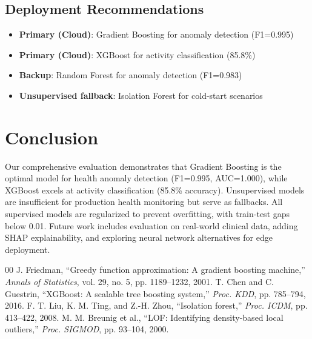 \documentclass[conference]{IEEEtran}
\begin{document}
\subsection{Deployment Recommendations}
\begin{itemize}
    \item \textbf{Primary (Cloud)}: Gradient Boosting for anomaly detection (F1=0.995)
    \item \textbf{Primary (Cloud)}: XGBoost for activity classification (85.8\%)
    \item \textbf{Backup}: Random Forest for anomaly detection (F1=0.983)
    \item \textbf{Unsupervised fallback}: Isolation Forest for cold-start scenarios
\end{itemize}

\section{Conclusion}
Our comprehensive evaluation demonstrates that Gradient Boosting is the optimal model for health anomaly detection (F1=0.995, AUC=1.000), while XGBoost excels at activity classification (85.8\% accuracy). Unsupervised models are insufficient for production health monitoring but serve as fallbacks. All supervised models are regularized to prevent overfitting, with train-test gaps below 0.01. Future work includes evaluation on real-world clinical data, adding SHAP explainability, and exploring neural network alternatives for edge deployment.

\begin{thebibliography}{00}
 J. Friedman, ``Greedy function approximation: A gradient boosting machine,'' \textit{Annals of Statistics}, vol. 29, no. 5, pp. 1189--1232, 2001.
 T. Chen and C. Guestrin, ``XGBoost: A scalable tree boosting system,'' \textit{Proc. KDD}, pp. 785--794, 2016.
 F. T. Liu, K. M. Ting, and Z.-H. Zhou, ``Isolation forest,'' \textit{Proc. ICDM}, pp. 413--422, 2008.
 M. M. Breunig et al., ``LOF: Identifying density-based local outliers,'' \textit{Proc. SIGMOD}, pp. 93--104, 2000.
\end{thebibliography}
\end{document}

